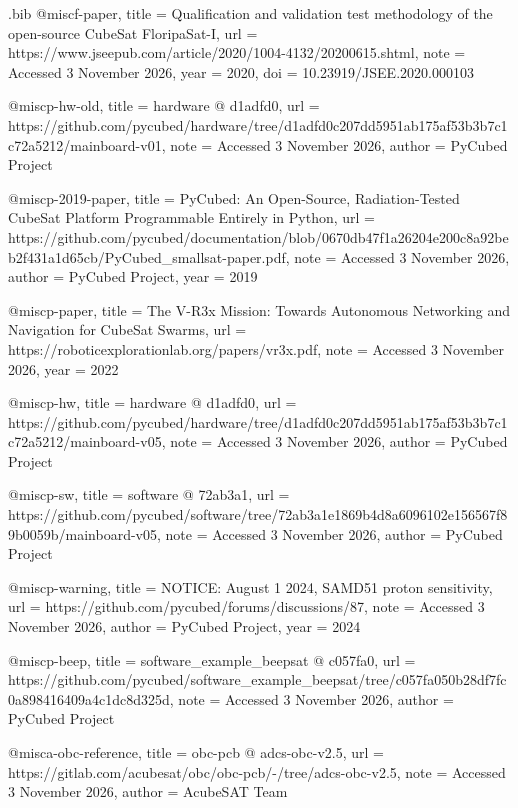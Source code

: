 \begin{filecontents*}[overwrite]{\jobname.bib}
@misc{f-paper,
  title = {{Qualification and validation test methodology of the open-\allowbreak{}source CubeSat FloripaSat-\allowbreak{}I}},
  url = {https://www.jseepub.com/article/2020/1004-4132/20200615.shtml},
  note = {Accessed 3 November 2026},
  year = {2020},
  doi = {10.23919/JSEE.2020.000103}
}

@misc{p-hw-old,
  title = {{hardware @ d1adfd0}},
  url = {https://github.com/pycubed/hardware/tree/d1adfd0c207dd5951ab175af53b3b7c1c72a5212/mainboard-v01},
  note = {Accessed 3 November 2026},
  author = {{PyCubed Project}}
}

@misc{p-2019-paper,
  title = {{PyCubed: An Open-\allowbreak{}Source, Radiation-\allowbreak{}Tested CubeSat Platform Programmable Entirely in Python}},
  url = {https://github.com/pycubed/documentation/blob/0670db47f1a26204e200c8a92beb2f431a1d65cb/PyCubed_smallsat-paper.pdf},
  note = {Accessed 3 November 2026},
  author = {{PyCubed Project}},
  year = {2019}
}

@misc{p-paper,
  title = {{The V-\allowbreak{}R3x Mission: Towards Autonomous Networking and Navigation for CubeSat Swarms}},
  url = {https://roboticexplorationlab.org/papers/vr3x.pdf},
  note = {Accessed 3 November 2026},
  year = {2022}
}

@misc{p-hw,
  title = {{hardware @ d1adfd0}},
  url = {https://github.com/pycubed/hardware/tree/d1adfd0c207dd5951ab175af53b3b7c1c72a5212/mainboard-v05},
  note = {Accessed 3 November 2026},
  author = {{PyCubed Project}}
}

@misc{p-sw,
  title = {{software @ 72ab3a1}},
  url = {https://github.com/pycubed/software/tree/72ab3a1e1869b4d8a6096102e156567f89b0059b/mainboard-v05},
  note = {Accessed 3 November 2026},
  author = {{PyCubed Project}}
}

@misc{p-warning,
  title = {{NOTICE: August 1 2024, SAMD51 proton sensitivity}},
  url = {https://github.com/pycubed/forums/discussions/87},
  note = {Accessed 3 November 2026},
  author = {{PyCubed Project}},
  year = {2024}
}

@misc{p-beep,
  title = {{software\_\allowbreak{}example\_\allowbreak{}beepsat @ c057fa0}},
  url = {https://github.com/pycubed/software_example_beepsat/tree/c057fa050b28df7fc0a898416409a4c1dc8d325d},
  note = {Accessed 3 November 2026},
  author = {{PyCubed Project}}
}

@misc{a-obc-reference,
  title = {{obc-\allowbreak{}pcb @ adcs-\allowbreak{}obc-\allowbreak{}v2.5}},
  url = {https://gitlab.com/acubesat/obc/obc-pcb/-/tree/adcs-obc-v2.5},
  note = {Accessed 3 November 2026},
  author = {{AcubeSAT Team}}
}


\end{filecontents*}
